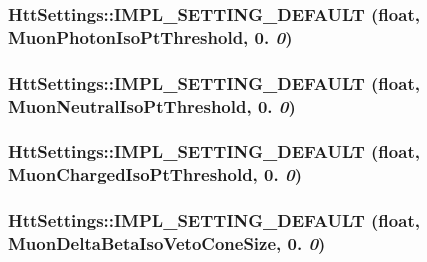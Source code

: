 \label{classHttSettings_a8001c74f4fbc97854d11ac2ef6cb62b7}
\hypertarget{classHttSettings_a6adfeaa92e8c8d17902e017089ff014c}{
\subsubsection[{IMPL\_\-SETTING\_\-DEFAULT}]{\setlength{\rightskip}{0pt plus 5cm}HttSettings::IMPL\_\-SETTING\_\-DEFAULT (float, \/  MuonPhotonIsoPtThreshold, \/  0. {\em 0})}}
\label{classHttSettings_a6adfeaa92e8c8d17902e017089ff014c}
\hypertarget{classHttSettings_a4a6545c4cd73b0d854bedd023245d66f}{
\subsubsection[{IMPL\_\-SETTING\_\-DEFAULT}]{\setlength{\rightskip}{0pt plus 5cm}HttSettings::IMPL\_\-SETTING\_\-DEFAULT (float, \/  MuonNeutralIsoPtThreshold, \/  0. {\em 0})}}
\label{classHttSettings_a4a6545c4cd73b0d854bedd023245d66f}
\hypertarget{classHttSettings_afa771e6ae4c3f99eef64de1eb5a102ae}{
\subsubsection[{IMPL\_\-SETTING\_\-DEFAULT}]{\setlength{\rightskip}{0pt plus 5cm}HttSettings::IMPL\_\-SETTING\_\-DEFAULT (float, \/  MuonChargedIsoPtThreshold, \/  0. {\em 0})}}
\label{classHttSettings_afa771e6ae4c3f99eef64de1eb5a102ae}
\hypertarget{classHttSettings_aa9661bf725b0831d31ce28fc385596e2}{
\subsubsection[{IMPL\_\-SETTING\_\-DEFAULT}]{\setlength{\rightskip}{0pt plus 5cm}HttSettings::IMPL\_\-SETTING\_\-DEFAULT (float, \/  MuonDeltaBetaIsoVetoConeSize, \/  0. {\em 0})}}
\label{classHttSettings_aa9661bf725b0831d31ce28fc385596e2}

